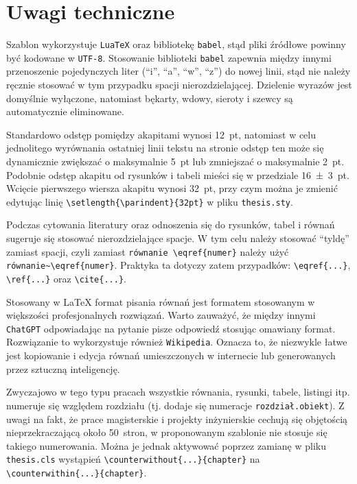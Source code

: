 \begin{listing}[ht!]
\inputminted[linenos, breaklines]{tex}{thesis.tex}
\end{listing}

\section{Uwagi techniczne}

Szablon wykorzystuje \texttt{LuaTeX} oraz bibliotekę \texttt{babel}, stąd pliki źródłowe powinny być kodowane w \texttt{UTF-8}. Stosowanie biblioteki \texttt{babel} zapewnia między innymi przenoszenie pojedynczych liter (\enquote{i}, \enquote{a}, \enquote{w}, \enquote{z}) do nowej linii, stąd nie należy ręcznie stosować w tym przypadku spacji nierozdzielającej. Dzielenie wyrazów jest domyślnie wyłączone, natomiast bękarty, wdowy, sieroty i szewcy są automatycznie eliminowane.

Standardowo odstęp pomiędzy akapitami wynosi \qty{12}{pt}, natomiast w celu jednolitego wyrównania ostatniej linii tekstu na stronie odstęp ten może się dynamicznie zwiększać o maksymalnie \qty{5}{pt} lub zmniejszać o maksymalnie \qty{2}{pt}. Podobnie odstęp akapitu od rysunków i tabeli mieści się w przedziale \qty{16 \pm 3}{pt}. Wcięcie pierwszego wiersza akapitu wynosi \qty{32}{pt}, przy czym można je zmienić edytując linię \verb|\setlength{\parindent}{32pt}| w pliku \texttt{thesis.sty}.

Podczas cytowania literatury oraz odnoszenia się do rysunków, tabel i równań sugeruje się stosować nierozdzielające spacje. W tym celu należy stosować \enquote{tyldę} zamiast spacji, czyli zamiast \verb|równanie \eqref{numer}| należy użyć \verb|równanie~\eqref{numer}|. Praktyka ta dotyczy zatem przypadków: \verb|\eqref{...}|, \verb|\ref{...}| oraz \verb|\cite{...}|.

Stosowany w \LaTeX{} format pisania równań jest formatem stosowanym w większości profesjonalnych rozwiązań. Warto zauważyć, że między innymi \texttt{ChatGPT} odpowiadając na pytanie pisze odpowiedź stosując omawiany format. Rozwiązanie to wykorzystuje również \texttt{Wikipedia}. Oznacza to, że niezwykle łatwe jest kopiowanie i edycja równań umieszczonych w internecie lub generowanych przez sztuczną inteligencję.

Zwyczajowo w tego typu pracach wszystkie równania, rysunki, tabele, listingi itp. numeruje się względem rozdziału (tj. dodaje się numeracje \texttt{rozdział.obiekt}). Z uwagi na fakt, że prace magisterskie i projekty inżynierskie cechują się objętością nieprzekraczającą około \qty{50}{stron}, w proponowanym szablonie nie stosuje się takiego numerowania. Można je jednak aktywować poprzez zamianę w pliku \texttt{thesis.cls} wystąpień \verb|\counterwithout{...}{chapter}| na \verb|\counterwithin{...}{chapter}|.

